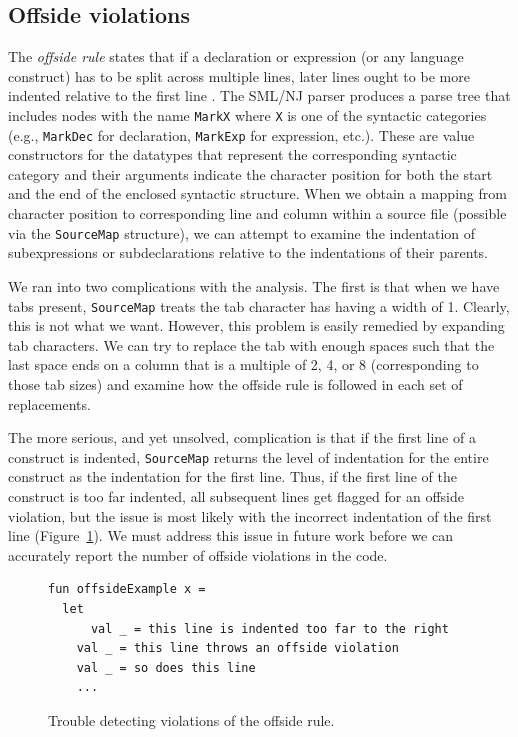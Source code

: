 \documentclass[12pt,abstracton]{scrartcl}
\begin{document}
\subsection{Offside violations}\label{subsec:offside}
The \emph{offside rule} states that if a declaration or expression (or any language construct)
has to be split across multiple lines, later lines ought to be more indented relative to
the first line \cite{Lan66}.
The SML/NJ parser produces a parse tree that includes nodes with the name \texttt{MarkX} where \texttt{X} is
one of the syntactic categories (e.g., \texttt{MarkDec} for declaration, \texttt{MarkExp} for expression,
etc.). These are value constructors for the datatypes that represent the corresponding
syntactic category and their arguments indicate the character position for both the start and the
end of the enclosed syntactic structure. When we obtain a mapping from character position
to corresponding line and column within a source file (possible via the \texttt{SourceMap} structure),
we can attempt to examine the indentation of subexpressions or subdeclarations relative to
the indentations of their parents.

We ran into two complications with the analysis. The first is that when we have tabs present,
\texttt{SourceMap} treats the tab character has having a width of 1. Clearly,
this is not what we want. However, this problem is easily remedied 
by expanding tab characters.
We can try to replace the tab with enough spaces such that
the last space ends on a column that is a multiple of 2, 4, or 8 (corresponding to those tab sizes)
and examine how the offside rule is followed in each set of replacements.

The more serious, and yet unsolved, complication is that if the first line of a construct
is indented, \texttt{SourceMap} returns the level of indentation
for the entire construct as the indentation for the first line.
Thus, if the first line of the construct is too far indented, all subsequent
lines get flagged for an offside violation, but the issue is most likely
with the incorrect indentation of the first line (Figure~\ref{fig:offside}). We must address this
issue in future work before we can accurately report the number
of offside violations in the code.
\begin{figure}[h!]
\centering
\begin{verbatim}
fun offsideExample x =
  let
      val _ = this line is indented too far to the right
    val _ = this line throws an offside violation
    val _ = so does this line
    ...
\end{verbatim}
\caption{Trouble detecting violations of the offside rule.}
\label{fig:offside}
\end{figure}
\end{document}
